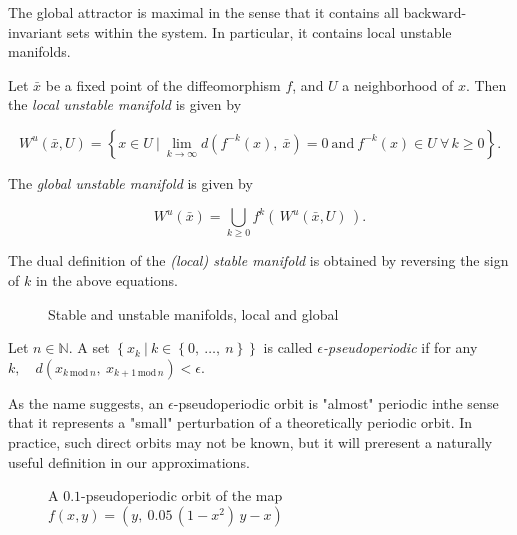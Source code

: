 The global attractor is maximal in the sense that it contains all backward-invariant 
sets within the system. In particular, it contains local unstable manifolds.

\begin{definition}
    \cite*{dynbook} Let $\bar{x}$ be a fixed point of the diffeomorphism $f$, and $U$ a neighborhood of $x$. 
    Then the \emph{local unstable manifold} is given by

    \begin{equation}
        W^u(\bar{x}, U) = \left\{x \in U\ \vert\ \lim\limits_{k \to \infty} 
        d(f^{-k}(x),\ \bar{x}) = 0\ \text{and}\ f^{-k}(x) \in U\ \forall\, k \geq 0\right\}.
    \end{equation}

    The \emph{global unstable manifold} is given by

    \begin{equation}
        W^u(\bar{x}) = \bigcup\limits_{k \geq 0} f^k(\,W^u(\bar{x}, U)\,).
    \end{equation}

    The dual definition of the \emph{(local) stable manifold} is obtained by reversing the 
    sign of $k$ in the above equations.
\end{definition}

\begin{figure}[ht]
    \caption{\cite*{dynskript} Stable and unstable manifolds, local and global}
    \label{fig:manifold}    
\end{figure}

\begin{definition}[Pseudoperiodic]
    \cite*{dynbook} Let $n\in \mathbb{N}$. A set 
    $\left\{ x_k\ \vert\ k \in \left\{ 0,\ \dotsc ,\ n \right\} \right\}$ 
    is called \emph{$\epsilon$-pseudoperiodic} if for any
    $k, \quad d(x_{k\, \text{mod}\, n},\ x_{k + 1\, \text{mod}\, n}) < \epsilon$.
\end{definition}

As the name suggests, an $\epsilon$-pseudoperiodic orbit is "almost" periodic inthe sense 
that it represents a "small" perturbation of a theoretically periodic orbit. In practice,
such direct orbits may not be known, but it will preresent a naturally useful definition
in our approximations.

\begin{figure}[ht]
    \caption{\cite*{dynbook} A $0.1$-pseudoperiodic orbit of the map $f(x,y) = (y,\ 0.05\, (1 - x^2)\, y - x)$}
    \label{fig:pseudoperiodic}
\end{figure}

